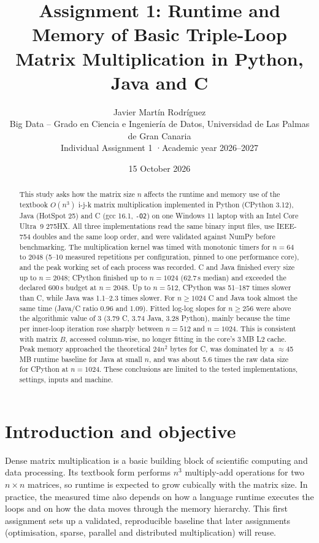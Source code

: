 \documentclass[11pt,a4paper]{article}
\title{\textbf{Assignment 1: Runtime and Memory of Basic Triple-Loop\\
Matrix Multiplication in Python, Java and C}}
\author{Javier Martín Rodríguez\\[2pt]
\small Big Data -- Grado en Ciencia e Ingeniería de Datos, Universidad de Las Palmas de Gran Canaria\\
\small Individual Assignment 1 \quad·\quad Academic year 2026--2027}
\date{15 October 2026}
\begin{document}
\maketitle

\begin{abstract}
\noindent
This study asks how the matrix size $n$ affects the runtime and memory use of the textbook
$O(n^3)$ i-j-k matrix multiplication implemented in Python (CPython 3.12), Java (HotSpot 25)
and C (gcc 16.1, \texttt{-O2}) on one Windows 11 laptop with an Intel Core Ultra~9 275HX.
All three implementations read the same binary input files, use IEEE-754 doubles and the same
loop order, and were validated against NumPy before benchmarking. The multiplication kernel
was timed with monotonic timers for $n = 64$ to $2048$ (5--10 measured repetitions per
configuration, pinned to one performance core), and the peak working set of each process was recorded.
C and Java finished every size up to $n = 2048$; CPython finished up to $n = 1024$
(62.7\,s median) and exceeded the declared 600\,s budget at $n = 2048$. Up to $n = 512$, CPython was
51--187 times slower than C, while Java was 1.1--2.3 times slower. For $n \ge 1024$ C and Java took
almost the same time (Java/C ratio 0.96 and 1.09). Fitted log-log slopes for $n \ge 256$ were above
the algorithmic value of 3 (3.79 C, 3.74 Java, 3.28 Python), mainly because the time per inner-loop
iteration rose sharply between $n = 512$ and $n = 1024$. This is consistent with matrix $B$, accessed
column-wise, no longer fitting in the core's 3\,MB L2 cache. Peak memory approached the
theoretical $24n^2$ bytes for C, was dominated by a $\approx$45\,MB runtime baseline for Java at small
$n$, and was about 5.6 times the raw data size for CPython at $n = 1024$. These conclusions are
limited to the tested implementations, settings, inputs and machine.
\end{abstract}

\section{Introduction and objective}

Dense matrix multiplication is a basic building block of scientific computing and data
processing. Its textbook form performs $n^3$ multiply-add operations for two $n\times n$ matrices,
so runtime is expected to grow cubically with the matrix size. In practice, the measured time also
depends on how a language runtime executes the loops and on how the data moves through the memory
hierarchy. This first assignment sets up a validated, reproducible baseline that later
assignments (optimisation, sparse, parallel and distributed multiplication) will reuse.
\end{document}
